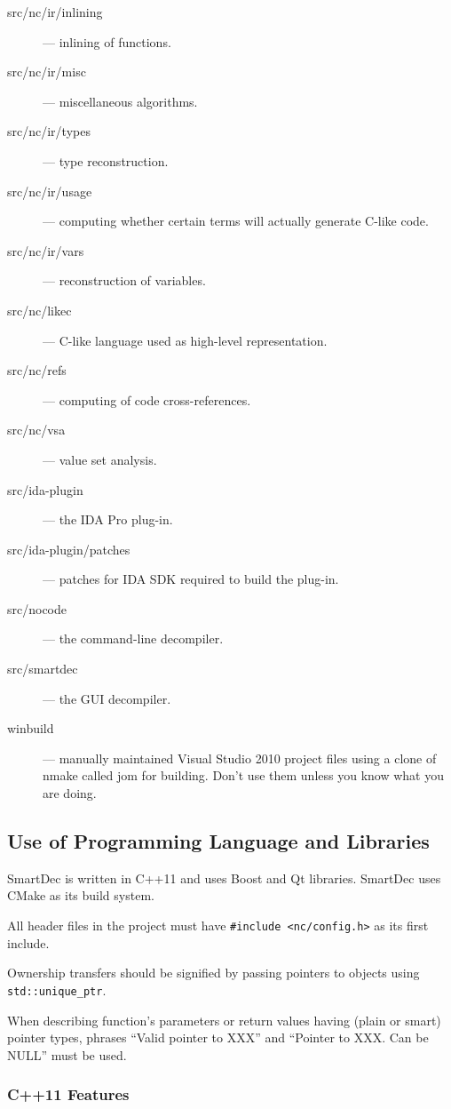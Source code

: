 \documentclass[a4paper,12pt]{article}
\begin{document}
\begin{description}
\item[src/nc/ir/inlining] --- inlining of functions.
\item[src/nc/ir/misc] --- miscellaneous algorithms.
\item[src/nc/ir/types] --- type reconstruction.
\item[src/nc/ir/usage] --- computing whether certain terms will actually generate C-like code.
\item[src/nc/ir/vars] --- reconstruction of variables.
\item[src/nc/likec] --- C-like language used as high-level representation.
\item[src/nc/refs] --- computing of code cross-references.
\item[src/nc/vsa] --- value set analysis.
\item[src/ida-plugin] --- the IDA Pro plug-in.
\item[src/ida-plugin/patches] --- patches for IDA SDK required to build the plug-in.
\item[src/nocode] --- the command-line decompiler.
\item[src/smartdec] --- the GUI decompiler.
\item[winbuild] --- manually maintained Visual Studio 2010 project files using a clone of nmake called jom for building.
Don't use them unless you know what you are doing.
\end{description}

\subsection{Use of Programming Language and Libraries}

SmartDec is written in C++11 and uses Boost and Qt libraries.
SmartDec uses CMake as its build system.

All header files in the project must have \verb|#include <nc/config.h>| as its first include.

Ownership transfers should be signified by passing pointers to objects using \verb|std::unique_ptr|.

When describing function's parameters or return values having (plain or smart) pointer types, phrases ``Valid pointer to XXX'' and ``Pointer to XXX. Can be NULL'' must be used.

\subsubsection{C++11 Features}
\end{document}
